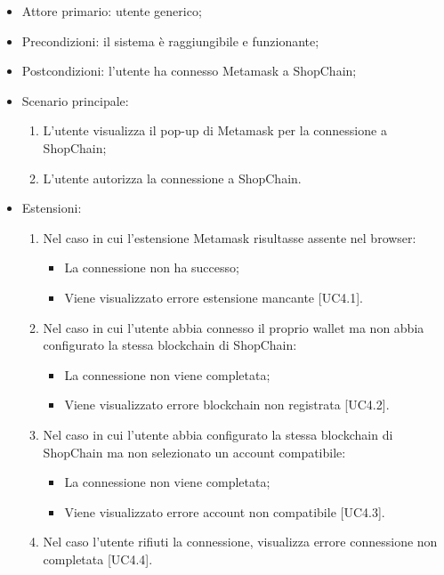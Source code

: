 \begin{itemize}
    \item Attore primario: utente generico;
    \item Precondizioni: il sistema è raggiungibile e funzionante;
    \item Postcondizioni: l'utente ha connesso Metamask\glo{} a ShopChain;
    \item Scenario principale:
          \begin{enumerate}
              \item L'utente visualizza il pop-up di Metamask\glo{} per la connessione a ShopChain;
              \item L'utente autorizza la connessione a ShopChain.
          \end{enumerate}
    \item Estensioni:
          \begin{enumerate}
              \item Nel caso in cui l'estensione Metamask\glo{} risultasse assente nel browser:
                    \begin{itemize}
                        \item La connessione non ha successo;
                        \item Viene visualizzato errore estensione mancante [UC4.1].
                    \end{itemize}
              \item Nel caso in cui l'utente abbia connesso il proprio wallet\glo{} ma non abbia configurato la stessa blockchain\glo{} di ShopChain:
                    \begin{itemize}
                        \item La connessione non viene completata;
                        \item Viene visualizzato errore blockchain\glo{} non registrata [UC4.2].
                    \end{itemize}
              \item Nel caso in cui l'utente abbia configurato la stessa blockchain\glo{} di ShopChain ma non selezionato un account compatibile:
                    \begin{itemize}
                        \item La connessione non viene completata;
                        \item Viene visualizzato errore account non compatibile [UC4.3].
                    \end{itemize}
              \item Nel caso l'utente rifiuti la connessione, visualizza errore connessione non completata [UC4.4].
          \end{enumerate}
\end{itemize}

